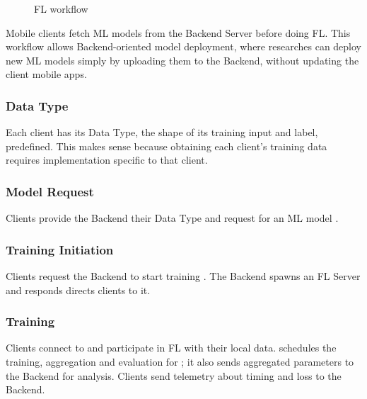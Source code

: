 \documentclass[letterpaper]{article} %
\begin{document}
\begin{figure}
\centering
{}
\caption{FL workflow}
\label{fig:fl-workflow}
\end{figure}

Mobile clients fetch ML models from the Backend Server before doing FL.
This workflow allows Backend-oriented model deployment, where researches can
deploy new ML models simply by uploading them to the Backend,
without updating the client mobile apps.

\subsubsection{Data Type}
Each client has its Data Type, the shape of its training input and label,
predefined.
This makes sense because obtaining each client's training data requires
implementation specific to that client.

\subsubsection{Model Request}
Clients provide the Backend their Data Type and request for an ML model \model.

\subsubsection{Training Initiation}
Clients request the Backend to start training \model.
The Backend spawns an FL Server \fs{} and responds directs clients to it.

\subsubsection{Training}
Clients connect to \fs{} and participate in FL with their local data.
\fs{} schedules the training, aggregation and evaluation for \model;
it also sends aggregated parameters to the Backend for analysis.
Clients send telemetry about timing and loss to the Backend.
\end{document}
